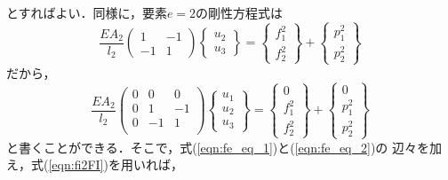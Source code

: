 \documentclass[10pt,a4j]{jarticle}
\begin{document}
とすればよい．同様に，要素$e=2$の剛性方程式は
\begin{equation}
	\frac{EA_2}{l_2}
	\left(
	\begin{array}{cc}
		 1 & -1 \\
		-1 & 1 
	\end{array}
	\right)
	\left\{
	\begin{array}{c}
		u_2 \\
		u_3
	\end{array}
	\right\}
	=
	\left\{
	\begin{array}{c}
		f^2_1  \\
		f^2_2  
	\end{array}
	\right\}
	+
	\left\{
	\begin{array}{c}
		p^2_1 \\
		p^2_2
	\end{array}
	\right\}
	\label{eqn:fe_eq_2}
\end{equation}
だから，
\begin{equation}
	\frac{EA_2}{l_2}
	\left(
	\begin{array}{ccc}
		0 & 0  & 0 \\
		0 & 1 & -1 \\
		0 & -1 & 1  \\
	\end{array}
	\right)
	\left\{
	\begin{array}{c}
		u_1 \\
		u_2 \\
		u_3
	\end{array}
	\right\}
	=
	\left\{
	\begin{array}{c}
		0 \\
		f^2_1  \\
		f^2_2  
	\end{array}
	\right\}
	+
	\left\{
	\begin{array}{c}
		0 \\
		p^2_1 \\
		p^2_2
	\end{array}
	\right\}
	\label{eqn:fe_eq_2}
\end{equation}
と書くことができる．そこで，式(\ref{eqn:fe_eq_1})と(\ref{eqn:fe_eq_2})の
辺々を加え，式(\ref{eqn:fi2FI})を用いれば，
\end{document}
